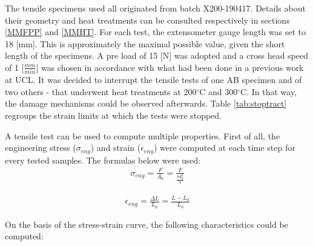 The tensile specimens used all originated from batch X200-190417. Details about their geometry and heat treatments can be consulted respectively in sections \ref{MMFPP} and \ref{MMHT}. For each test, the extensometer gauge length was set to 18 [mm]. This is approximately the maximal possible value, given the short length of the specimens. A pre load of 15 [N] was adopted and a cross head speed of 1 [$\frac{mm}{min}$] was chosen in accordance with what had been done in a previous work at UCL. It was decided to interrupt the tensile tests of one AB specimen and of two others - that underwent heat treatments at 200$^\circ$C and 300$^\circ$C. In that way, the damage mechanisms could be observed afterwards. Table \ref{tab:stoptract} regroups the strain limits at which the tests were stopped.\\

 \begin{center}
\begin{table}[ht]
\noindent{}

\caption[Strain limits for interrupted tensile tests of batch X200-180417 specimens]{Strain limits for interrupted tensile tests of batch X200-180417 specimens}
\label{tab:stoptract}
\end{table}
 \end{center}

A tensile test can be used to compute multiple properties. First of all,  the engineering stress ($\sigma_{eng}$) and strain  ($\epsilon_{eng}$) were computed at each time step for every tested samples. The formulas below were used:\\

\begin{align*}
\sigma_{eng}=\frac{F}{A_0}=\frac{F}{\frac{\pi d_0^2}{4}}
\end{align*}

\begin{align*}
\epsilon_{eng}=\frac{\Delta L}{L_0}=\frac{L-L_0}{L_0}
\end{align*}

On the basis of the stress-strain curve, the following characteristics could be computed:

